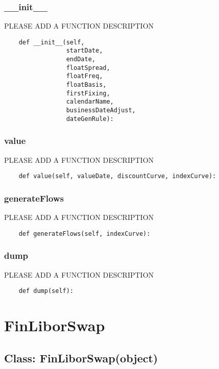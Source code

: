 \documentclass[twoside,11pt]{book}
\begin{document}
\subsubsection*{{\bf \_\_init\_\_}}
PLEASE ADD A FUNCTION DESCRIPTION

\begin{lstlisting}
    def __init__(self,
                 startDate,
                 endDate,
                 floatSpread,
                 floatFreq,
                 floatBasis,
                 firstFixing,
                 calendarName,
                 businessDateAdjust,
                 dateGenRule):
\end{lstlisting}

\subsubsection*{{\bf value}}
PLEASE ADD A FUNCTION DESCRIPTION

\begin{lstlisting}
    def value(self, valueDate, discountCurve, indexCurve):
\end{lstlisting}

\subsubsection*{{\bf generateFlows}}
PLEASE ADD A FUNCTION DESCRIPTION

\begin{lstlisting}
    def generateFlows(self, indexCurve):
\end{lstlisting}

\subsubsection*{{\bf dump}}
PLEASE ADD A FUNCTION DESCRIPTION

\begin{lstlisting}
    def dump(self):
\end{lstlisting}

\newpage
\section{FinLiborSwap}

\subsection*{Class: FinLiborSwap(object)}
\end{document}
